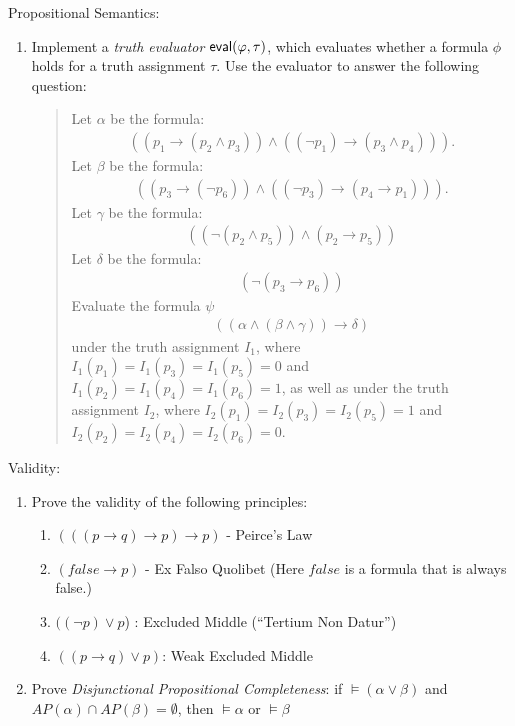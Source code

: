 \bigskip
\noindent
{\sf Propositional Semantics}:
\begin{enumerate}
\item
Implement a {\em truth evaluator\/} $\mbox{\sf eval}(\phi,\tau)$, 
which evaluates whether a formula $\phi$ holds for a truth assignment
$\tau$. Use the evaluator to answer the following question:
\begin{quote}
Let $\alpha$ be the formula:
\[
\begin{array}{l}
((p_1 \rightarrow (p_2 \wedge p_3)) \wedge 
((\neg p_1) \rightarrow (p_3 \wedge p_4))).
\end{array}
\]
Let $\beta$ be the formula:
\[
\begin{array}{l}
((p_3 \rightarrow (\neg p_6)) \wedge 
((\neg p_3) \rightarrow (p_4 \rightarrow p_1))).
\end{array}
\]
Let $\gamma$ be the formula:
\[
\begin{array}{l}
((\neg (p_2 \wedge p_5)) \wedge (p_2 \rightarrow p_5))
\end{array}
\]
Let $\delta$ be the formula:
\[
\begin{array}{l}
(\neg (p_3 \rightarrow p_6))
\end{array}
\]
Evaluate the formula $\psi$
\[
\begin{array}{l}
((\alpha \wedge (\beta \wedge \gamma)) \rightarrow \delta)
\end{array}
\]
under the truth assignment $I_1$, 
where $I_1(p_1)=I_1(p_3)=I_1(p_5)=0$ 
and $I_1(p_2)=I_1(p_4)=I_1(p_6)=1$, as well as
under the truth assignment $I_2$, 
where $I_2(p_1)=I_2(p_3)=I_2(p_5)=1$ 
and $I_2(p_2)=I_2(p_4)=I_2(p_6)=0$.
\end{quote}
\end{enumerate}

\noindent
{\sf Validity}: 
\begin{enumerate}
\item
Prove the validity of the following principles:
\begin{enumerate}
\item
$(((p\rightarrow q) \rightarrow p)\rightarrow p)$  - Peirce's  Law
\item
$(false \rightarrow p)$ - Ex Falso Quolibet (Here $false$ is a
formula that is always false.)
\item
$((\neg p) \vee p$) : Excluded Middle (``Tertium Non Datur'')
\item
$((p\rightarrow q) \vee p)$: Weak Excluded Middle
\end{enumerate}
\item
Prove \emph{Disjunctional Propositional Completeness}:
if $\models (\alpha\vee\beta)$ and $AP(\alpha)\cap AP(\beta)=\emptyset$,
then $\models\alpha$ or $\models\beta$
\end{enumerate}

